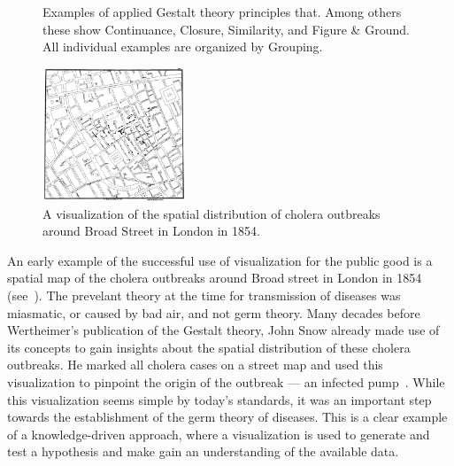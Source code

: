 \begin{figure}
  \centering
  \caption{Examples of applied Gestalt theory principles that.  Among others these show Continuance, Closure, Similarity, and Figure \& Ground.  All individual examples are organized by Grouping.}
  \label{fig:motivation:gestalt}
\end{figure}

\newpage

\begin{figure}
  \centering
    \includegraphics[width=0.38\textwidth]{figures/motivation/cholera.jpg}
    \caption{A visualization of the spatial distribution of cholera outbreaks around Broad Street in London in 1854.}
    \label{fig:motivation:example:cholera}
\end{figure}

An early example of the successful use of visualization for the public good is a spatial map of the cholera outbreaks around Broad street in London in 1854 (see~).  The prevelant theory at the time for transmission of diseases was miasmatic, or caused by bad air, and not germ theory.  Many decades before Wertheimer's publication of the Gestalt theory, John Snow already made use of its concepts to gain insights about the spatial distribution of these cholera outbreaks.  He marked all cholera cases on a street map and used this visualization to pinpoint the origin of the outbreak --- an infected pump~\cite{snow1855mode}.  While this visualization seems simple by today's standards, it was an important step towards the establishment of the germ theory of diseases.  This is a clear example of a knowledge-driven approach, where a visualization is used to generate and test a hypothesis and make gain an understanding of the available data.

